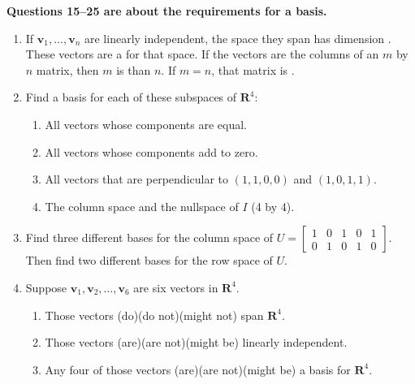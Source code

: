 \documentclass[14pt, a4paper]{article}
\begin{document}
\noindent \textbf{Questions 15--25 are about the requirements for a basis.}

\begin{enumerate}[resume]
    \item If $\boldsymbol{v}_1, \dots, \boldsymbol{v}_n$ are linearly independent, the space they span has dimension \underline{\hspace{2cm}}. These vectors are a \underline{\hspace{2cm}} for that space. If the vectors are the columns of an $m$ by $n$ matrix, then $m$ is \underline{\hspace{2cm}} than $n$. If $m = n$, that matrix is \underline{\hspace{2cm}}.

    \item Find a basis for each of these subspaces of $\mathbf{R}^4$:
          \begin{enumerate}
              \item All vectors whose components are equal.
              \item All vectors whose components add to zero.
              \item All vectors that are perpendicular to $(1, 1, 0, 0)$ and $(1, 0, 1, 1)$.
              \item The column space and the nullspace of $I$ (4 by 4).
          \end{enumerate}

    \item Find three different bases for the column space of $U = \begin{bmatrix} 1 & 0 & 1 & 0 & 1 \\ 0 & 1 & 0 & 1 & 0 \end{bmatrix}$. Then find two different bases for the row space of $U$.

    \item Suppose $\boldsymbol{v}_1, \boldsymbol{v}_2, \dots, \boldsymbol{v}_6$ are six vectors in $\mathbf{R}^4$.
          \begin{enumerate}
              \item Those vectors (do)(do not)(might not) span $\mathbf{R}^4$.
              \item Those vectors (are)(are not)(might be) linearly independent.
              \item Any four of those vectors (are)(are not)(might be) a basis for $\mathbf{R}^4$.
          \end{enumerate}


\end{enumerate}
\end{document}
